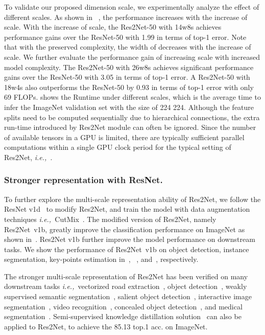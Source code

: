 \documentclass[10pt,journal,cspaper,compsoc]{IEEEtran}
\newcommand{\myPara}[1]{\subsubsection{#1}}
\newcommand{\ourM}{{Res2Net}}
\def\ie{\emph{i.e.,~}}
\begin{document}
To validate our proposed dimension scale,
we experimentally analyze the effect of different scales.
As shown in ~,
the performance increases with the increase of scale.
With the increase of scale, the \ourM-50 with 14w8s
achieves performance gains over the ResNet-50 with 1.99 in terms of top-1 error.
Note that with the preserved complexity,
the width of  decreases with the increase of scale.
We further evaluate the performance gain of increasing scale with increased model complexity.
The \ourM-50 with 26w8s
achieves significant performance gains over the ResNet-50 with 3.05 in terms of top-1 error.
A \ourM-50 with 18w4s also outperforms the ResNet-50 
by 0.93 in terms of top-1 error with only 69 FLOPs.
 shows the Runtime under different scales, 
which is the average time to infer the ImageNet validation set with the 
size of 224  224.
Although the feature splits  need to be computed sequentially 
due to hierarchical connections,
the extra run-time introduced by Res2Net module can often be ignored.
Since the number of available tensors in a GPU is limited,
there are typically sufficient parallel computations within a single GPU
clock period for the typical setting of Res2Net, \ie .

\myPara{Stronger representation with ResNet.}
To further explore the multi-scale representation ability of Res2Net,
we follow the ResNet v1d~\cite{he2019bag} to modify Res2Net,
and train the model with data augmentation techniques \ie CutMix~\cite{yun2019cutmix}.
The modified version of Res2Net, namely Res2Net~v1b,
greatly improve the classification performance on ImageNet as shown in~.
Res2Net v1b further improve the model performance on downstream tasks. 
We show the performance of Res2Net~v1b
on object detection, instance segmentation, key-points estimation in~, 
~, and~, respectively.

The stronger multi-scale representation of Res2Net 
has been verified on many downstream tasks \ie vectorized road extraction~\cite{VecRoad_20CVPR},
object detection~\cite{li2020generalized},
weakly supervised semantic segmentation~\cite{21PAMI_InsImgDatasetWSIS}, salient object detection~\cite{GaoEccv20Sal100K},
interactive image segmentation~\cite{fClick20CVPR}, video recognition~\cite{li2020tea}, 
concealed object detection~\cite{fan2021concealed},
and medical segmentation~\cite{wu2020jcs,fan2020pranet,fan2020inf}.
Semi-supervised knowledge distillation solution~\cite{ma2019paddlepaddle} 
can also be applied to Res2Net,
to achieve the 85.13 top.1 acc. on ImageNet.
\end{document}
